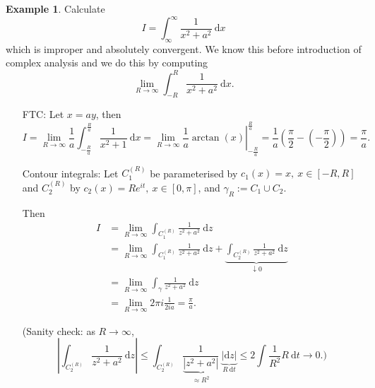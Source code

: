 \documentclass[a4paper]{article}
\theoremstyle{definition}
\newtheorem{example}[defn]{Example}
\begin{document}
\begin{example}
Calculate
\[
I=\int_{\infty}^\infty \frac{1}{x^2+a^2} \ \mathrm d x
\]
which is improper and absolutely convergent. We know this before introduction of complex analysis and we do this by computing
\[
\lim_{R\rightarrow \infty} \int_{-R}^R \frac{1}{x^2+a^2} \ \mathrm d x.
\]
\begin{itemize}
    \item[FTC:] Let $x=ay$, then
    \[
    I=\lim_{R\rightarrow \infty} \frac{1}{a} \int_{-\frac{R}{a}}^{\frac{R}{a}} \frac{1}{x^2+1} \ \mathrm d x=\left.\lim_{R\rightarrow \infty} \frac{1}{a} \arctan(x)\right|_{-\frac{R}{a}}^{\frac{R}{a}} =\frac{1}{a} \left(\frac{\pi}{2}-\left(-\frac{\pi}{2}\right) \right)=\frac{\pi}{a}.
    \]
    \item[Contour integrals:] Let $C_1^{(R)}$ be parameterised by $c_1(x)=x,\ x\in [-R,R]$ and $C_2^{(R)}$ by $c_2(x)=Re^{it}, \ x\in [0,\pi]$, and $\gamma_R := C_1 \cup C_2$.
    \begin{center}
    \end{center}
    Then
    \[
    \begin{aligned}
    I&=\lim_{R\rightarrow \infty} \int_{C_1^{(R)}} \frac{1}{z^2+a^2} \ \mathrm d z \\
    &= \lim_{R\rightarrow \infty} \int_{C_1^{(R)}} \frac{1}{z^2+a^2} \ \mathrm d z+\underbrace{\int_{C_2^{(R)}} \frac{1}{z^2+a^2} \ \mathrm d z}_{\downarrow 0} \\
    &= \lim_{R\rightarrow \infty} \int_{\gamma} \frac{1}{z^2+a^2} \ \mathrm d z \\
    &= \lim_{R\rightarrow \infty} 2 \pi i \frac{1}{2ia} = \frac{\pi}{a} .
    \end{aligned}
    \]

    (Sanity check: as $R\rightarrow \infty$,
    \[
    \left| \int_{C_2^{(R)}} \frac{1}{z^2+a^2} \ \mathrm d z \right| \leq \int_{C_2^{(R)}} \frac{1}{\underbrace{|z^2+a^2|}_{\approx R^2}} \ \underbrace{|\mathrm d z|}_{R \ \mathrm d t} \leq 2 \int \frac{1}{R^2} R \ \mathrm d t \rightarrow 0.)
    \]
\end{itemize}
\end{example}
\end{document}
